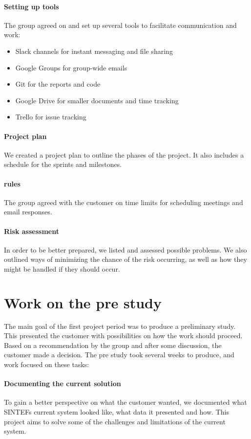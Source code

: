 \documentclass[11pt,a4paper,titlepage,oneside]{report}
\begin{document}
\paragraph{Setting up tools}
The group agreed on and set up several tools to facilitate communication and work:
\begin{itemize}
	\item Slack channels for instant messaging and file sharing
	\item Google Groups for group-wide emails
	\item Git for the reports and code
	\item Google Drive for smaller documents and time tracking
	\item Trello for issue tracking
\end{itemize}

\paragraph{Project plan}
We created a project plan to outline the phases of the project. It also includes a schedule for the sprints and milestones.
	
\paragraph{ rules}
The group agreed with the customer on time limits for scheduling meetings and email responses.

\paragraph{Risk assessment}
In order to be better prepared, we listed and assessed possible problems. We also outlined ways of minimizing the chance of the risk occurring, as well as how they might be handled if they should occur.

\section{Work on the pre study}
The main goal of the first project period was to produce a preliminary study. This presented the customer with possibilities on how the work should proceed. Based on a recommendation by the group and after some discussion, the customer made a decision. The pre study took several weeks to produce, and work focused on these tasks:

\paragraph{Documenting the current solution}
To gain a better perspective on what the customer wanted, we documented what SINTEFs current system looked like, what data it presented and how. This project aims to solve some of the challenges and limitations of the current system.
\end{document}
